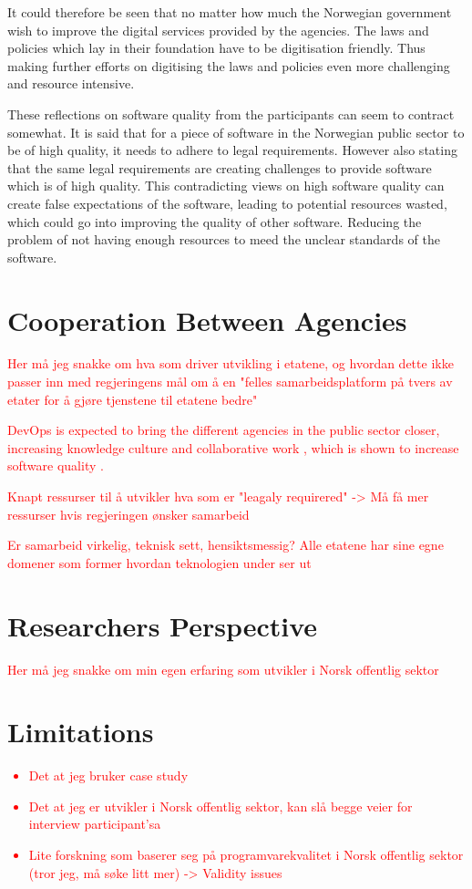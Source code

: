 It could therefore be seen that no matter how much the Norwegian government wish to improve the digital services provided by the agencies. The laws and policies which lay in their foundation have to be digitisation friendly. Thus making further efforts on digitising the laws and policies even more challenging and resource intensive.

These reflections on software quality from the participants can seem to contract somewhat. It is said that for a piece of software in the Norwegian public sector to be of high quality, it needs to adhere to legal requirements. However also stating that the same legal requirements are creating challenges to provide software which is of high quality. This contradicting views on high software quality can create false expectations of the software, leading to potential resources wasted, which could go into improving the quality of other software. Reducing the problem of not having enough resources to meed the unclear standards of the software.

\section{Cooperation Between Agencies}
\textcolor{red}{Her må jeg snakke om hva som driver utvikling i etatene, og hvordan dette ikke passer inn med regjeringens mål om å en "felles samarbeidsplatform på tvers av etater for å gjøre tjenstene til etatene bedre"}

\textcolor{red}{DevOps is expected to bring the different agencies in the public sector closer, increasing knowledge culture and collaborative work \cite{mm_2021}, which is shown to increase software quality \cite{smm_2018}.}

\textcolor{red}{Knapt ressurser til å utvikler hva som er "leagaly requirered" -> Må få mer ressurser hvis regjeringen ønsker samarbeid}

\textcolor{red}{Er samarbeid virkelig, teknisk sett, hensiktsmessig? Alle etatene har sine egne domener som former hvordan teknologien under ser ut}

\section{Researchers Perspective}
\textcolor{red}{Her må jeg snakke om min egen erfaring som utvikler i Norsk offentlig sektor}

\section{Limitations}
\textcolor{red}{\begin{itemize}
    \item Det at jeg bruker case study
    \item Det at jeg er utvikler i Norsk offentlig sektor, kan slå begge veier for interview participant'sa
    \item Lite forskning som baserer seg på programvarekvalitet i Norsk offentlig sektor (tror jeg, må søke litt mer) -> Validity issues
\end{itemize}}

